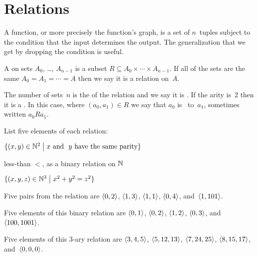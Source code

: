 \documentclass{test}  %
\begin{document}
\section{Relations}
A function, or more precisely the function's graph, is a set of $n$~tuples
subject to the condition that the input determines the output.
The generalization that we get by dropping the condition is useful.  

\begin{df}
A  on sets $A_0$, \ldots, $A_{n-1}$ is a subset
$R\subseteq A_0\times \cdots \times A_{n-1}$. 
If all of the sets are the same $A_0=A_1=\cdots =A$
then we say it is a relation on~$A$.

The number of sets~$n$ is the  of the relation
and we say it is .
If the arity is~$2$ then it is a .
In this case, where $(a_0,a_1)\in R$ we say 
that $a_0$ is~ to~$a_1$,
sometimes written $a_0Ra_1$.
\end{df}

\begin{ex}
List five elements of each relation:
\begin{items}
\item $\{(x,y)\in \mathbb{N}^2 \bigm| \text{$x$ and ~$y$ have the same parity}\}$
\item less-than $<$, as a binary relation on $\mathbb{N}$
\item $\{(x,y,z)\in\mathbb{N}^3 \bigm| x^2+y^2=z^2\}$
\end{items}
\begin{ans}
\begin{items}
\item Five pairs from the relation are
  $\langle0,2\rangle$, $\langle1,3\rangle$, $\langle1,1\rangle$, 
  $\langle0,4\rangle$, 
 and~$\langle1,101\rangle$.    
\item Five elements of this binary relation are 
  $\langle0,1\rangle$, $\langle0,2\rangle$, $\langle1,2\rangle$, $\langle0,3\rangle$,
  and~$\langle100,1001\rangle$. 
\item Five elements of this $3$-ary relation are
  $\langle3,4,5\rangle$, $\langle5,12,13\rangle$, $\langle7,24,25\rangle$, 
  $\langle8,15,17\rangle$, and~$\langle0,0,0\rangle$.
\end{items}
\end{ans}
\end{ex}
\end{document}
